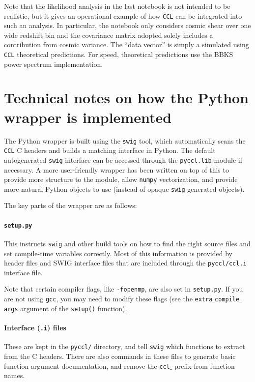 \documentclass[\docopts]{\docclass}
\newcommand{\ccl}{{\tt CCL}\xspace}
\begin{document}
Note that the likelihood analysis in the last notebook is not intended to be realistic, but it gives an operational example of how {\tt CCL} can be integrated into such an analysis. In particular, the notebook only considers cosmic shear over one wide redshift bin and the covariance matrix adopted solely includes a contribution from cosmic variance. The ``data vector'' is simply a simulated using {\tt CCL} theoretical predictions. For speed, theoretical predictions use the BBKS power spectrum implementation.


\section{Technical notes on how the Python wrapper is implemented}
\label{sec:python:technical}

The Python wrapper is built using the {\tt swig} tool, which automatically scans the \ccl C headers and builds a matching interface in Python. The default autogenerated {\tt swig} interface can be accessed through the {\tt pyccl.lib} module if necessary. A more user-friendly wrapper has been written on top of this to provide more structure to the module, allow {\tt numpy} vectorization, and provide more natural Python objects to use (instead of opaque {\tt swig}-generated objects).

The key parts of the wrapper are as follows:
\paragraph{{\tt setup.py}} This instructs {\tt swig} and other build tools on how to find the right source files and set compile-time variables correctly. Most of this information is provided by header files and SWIG interface files that are included through the {\tt pyccl/ccl.i} interface file.

Note that certain compiler flags, like {\tt -fopenmp}, are also set in {\tt setup.py}. If you are not using {\tt gcc}, you may need to modify these flags (see the {\tt extra$\_$compile$\_$args} argument of the {\tt setup()} function).

\paragraph{Interface ({\tt .i}) files} These are kept in the {\tt pyccl/} directory, and tell {\tt swig} which functions to extract from the C headers. There are also commands in these files to generate basic function argument documentation, and remove the {\tt ccl$\_$} prefix from function names.
\end{document}
